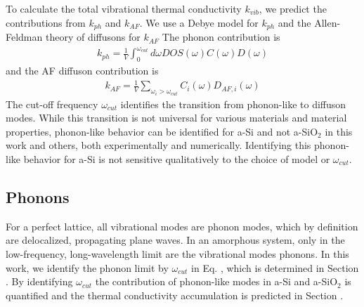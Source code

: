 \documentclass[aps,prb,twocolumn,superscriptaddress,footinbib,amsmath,amssymb,floatfix]{revtex4}
\begin{document}
To calculate the total vibrational thermal conductivity $k_{vib}$, we predict 
the contributions from $k_{ph}$ and $k_{AF}$. We use a Debye model 
for $k_{ph}$\cite{ashcroft} and the Allen-Feldman theory of diffusons 
for $k_{AF}$\cite{feldman_thermal_1993,feldman_numerical_1999}
The phonon contribution is
\begin{equation}\label{EQ:kvib2}
\begin{split}
k_{ph} = \frac{1}{V}\int_{0}^{\omega_{cut}} 
d\omega DOS(\omega) C(\omega) D(\omega)
\end{split}
\end{equation}
and the AF diffuson contribution is
\begin{equation}\label{EQ:kvib2}
\begin{split}
k_{AF} = \frac{1}{V}\sum_{\omega_i>\omega_{cut}} C_i(\omega) D_{AF,i}(\omega) 
\end{split}
\end{equation}
The cut-off frequency $\omega_{cut}$ identifies the transition from 
phonon-like to diffuson modes.
\cite{feldman_thermal_1993,feldman_numerical_1999,liu_high_2009} 
While this transition is not universal for 
various materials and material properties, phonon-like behavior 
can be identified for a-Si and not a-SiO$_2$ in this work and others, 
both experimentally
\cite{liu_high_2009,yang_anomalously_2010,minnich_thermal_2011,
regner_broadband_2013} 
and numerically.
\cite{feldman_thermal_1993,feldman_numerical_1999,
mcgaughey_thermal_2004,he_heat_2011} 
Identifying this phonon-like behavior for a-Si is not sensitive 
qualitatively to the choice of model
\cite{feldman_thermal_1993,feldman_numerical_1999,liu_high_2009} 
or $\omega_{cut}$.
\cite{feldman_thermal_1993,feldman_numerical_1999,
donadio_atomistic_2009,liu_high_2009,yang_anomalously_2010}

\subsection{\label{S:Theory:Thermal:Phonons}Phonons}

For a perfect lattice, 
all vibrational modes are phonon modes, which by 
definition are delocalized, propagating plane waves.
\cite{ziman_electrons_2001} In an amorphous system, only in the 
low-frequency, long-wavelength limit are the vibrational modes phonons. 
In this work, we identify the phonon limit by $\omega_{cut}$ in Eq. , 
which is determined in Section . By identifying $\omega_{cut}$  
the contribution of phonon-like modes in a-Si and 
a-SiO$_2$ is quantified and the thermal conductivity accumulation 
is predicted in Section .  
\end{document}
